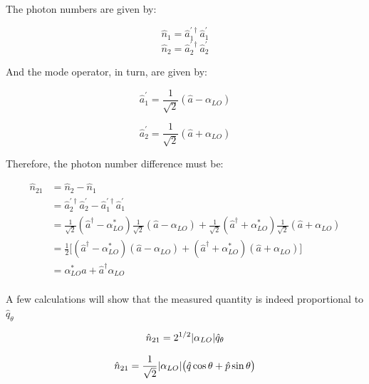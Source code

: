\documentclass[12pt,a4paper]{report}
\begin{document}
The photon numbers are given by:

\begin{equation}
    \hat n_1=\hat a^{'\dag}_1 \hat a^{'}_1
\end{equation}
\begin{equation}
    \hat n_2=\hat a^{'\dag}_2 \hat a^{'}_2
\end{equation}

And the mode operator, in turn, are given by:

\begin{equation}
    \hat a^{'}_1=\frac{1}{\sqrt{2}}(\hat a-\alpha_{LO})
\end{equation}

\begin{equation}
    \hat a^{'}_2=\frac{1}{\sqrt{2}}(\hat a+\alpha_{LO})
\end{equation}

Therefore, the photon number difference must be:

\begin{align*}
    \hat n_{21} &=\hat n_2-\hat n_1\\[0.3cm]
                &=\hat a^{'\dag}_2 \hat a^{'}_2-\hat a^{'\dag}_1 \hat a^{'}_1\\[0.3cm]
                &=\frac{1}{\sqrt{2}}(\hat a^{\dag}-\alpha^*_{LO})\frac{1}{\sqrt{2}}(\hat a-\alpha_{LO})+\frac{1}{\sqrt{2}}(\hat a^{\dag}+\alpha^*_{LO})\frac{1}{\sqrt{2}}(\hat a+\alpha_{LO})\\[0.3cm]
                &=\frac{1}{2}\Big[(\hat a^{\dag}-\alpha^*_{LO})(\hat a-\alpha_{LO})+(\hat a^{\dag}+\alpha^*_{LO})(\hat a+\alpha_{LO})\Big]\\[0.3cm]
                &=\alpha^*_{LO}\hat a+\hat a^{\dag}\alpha_{LO} \\[0.3cm]
\end{align*}


A few calculations will show that the measured quantity is indeed proportional to $\hat q_{\theta}$

\begin{equation}
    \hat n_{21}=2^{1/2}\abs{\alpha_{LO}}\hat q_{\theta}
\end{equation}

\begin{equation}
    \hat n_{21}=\frac{1}{\sqrt{2}}\abs{\alpha_{LO}}\big(\hat q \cos\theta+\hat p \sin\theta\big)
\end{equation}
\end{document}
